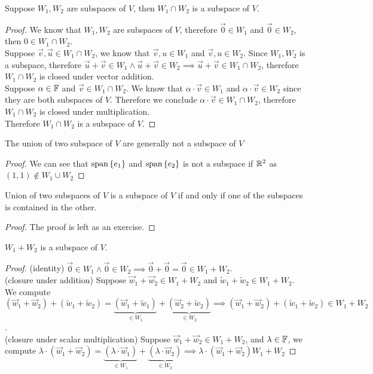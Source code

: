 \begin{theorem}
    Suppose $W_1,W_2$ are subspaces of $V$, then $W_1 \cap W_2$ is a subspace of $V$.
\end{theorem}
\begin{proof}
    We know that $W_1,W_2$ are subspaces of $V$, therefore $\vec 0 \in W_1$ and $\vec 0 \in W_2$, then $0 \in W_1 \cap W_2$. \\
    Suppose $\vec v,\vec u \in W_1 \cap W_2$, we know that $\vec v,u \in W_1$ and $\vec v,u \in W_2$. Since $W_1,W_2$ is a subspace, therefore $\vec u + \vec v \in W_1 \land \vec u + \vec v \in W_2 \implies \vec u + \vec v \in W_1 \cap W_2$, therefore $W_1 \cap W_2$ is closed under vector addition. \\ 
    Suppose $\alpha \in \mathbb F$ and $\vec v \in W_1 \cap W_2$. We know that $\alpha \cdot \vec v \in W_1$ and $\alpha \cdot \vec v \in W_2$ since they are both subspaces of $V$. Therefore we conclude $\alpha \cdot \vec v \in W_1 \cap W_2$, therefore $W_1 \cap W_2$ is closed under multiplication. \\
    Therefore $W_1 \cap W_2$ is a subspace of $V$.
\end{proof}
\begin{proposition}
    The union of two subspace of $V$ are generally not a subspace of $V$
\end{proposition}
\begin{proof}
    We can see that $\text{span} \left\{ e_1 \right\}$ and $\text{span} \left\{ e_2 \right\}$ is not a subspace if $\mathbb R^2$ as $(1,1) \not\in W_1 \cup W_2$ 
\end{proof}
\begin{theorem}
    Union of two subspaces of $V$ is a subspace of $V$ if and only if one of the subspaces is contained in the other.
\end{theorem}
\begin{proof}
    The proof is left as an exercise.
\end{proof}
\begin{theorem}
    $W_1 + W_2$ is a subspace of $V$.
\end{theorem}
\begin{proof}
    (identity) $\vec 0 \in W_1 \land \vec 0 \in W_2 \implies \vec 0 + \vec 0 = \vec 0 \in W_1 + W_2$. \\
    (closure under addition) Suppose $\vec w_1 + \vec w_2 \in W_1 + W_2$ and $\tilde w_1 + \tilde w_2 \in W_1 + W_2$. We compute $(\vec w_1 + \vec w_2) + (\tilde w_1 + \tilde w_2) = \underbrace{(\vec w_1 + \tilde w_1)}_{\in W_1} + \underbrace{(\vec w_2 + \tilde w_2)}_{\in W_2} \implies (\vec w_1 + \vec w_2) + (\tilde w_1 + \tilde w_2) \in W_1 + W_2$. \\
    (closure under scalar multiplication) Suppose $\vec w_1 + \vec w_2 \in W_1 + W_2$, and $\lambda \in \mathbb F$, we compute $\lambda \cdot (\vec w_1 + \vec w_2)  = \underbrace{(\lambda \cdot \vec w_1)}_{\in W_1} + \underbrace{(\lambda \cdot \vec w_2)}_{\in W_2} \implies \lambda \cdot (\vec w_1 + \vec w_2) W_1 + W_2$
\end{proof}
